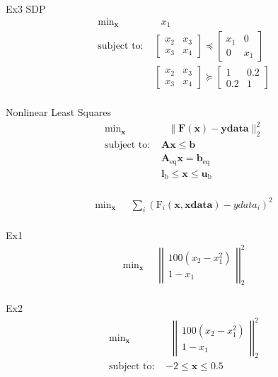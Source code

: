 \documentclass{article}
\begin{document}
Ex3 SDP
\begin{align*}
    \text{min}_{\mathbf{x}}& \text{ } x_1\\
    \mbox{subject to: }&\begin{bmatrix} x_2 & x_3 \\ x_3 & x_4 \end{bmatrix} \preceq \begin{bmatrix} x_1 & 0 \\ 0 & x_1 \end{bmatrix}\\
                       &\begin{bmatrix} x_2 & x_3 \\ x_3 & x_4 \end{bmatrix} \succeq \begin{bmatrix} 1 & 0.2 \\ 0.2 & 1 \end{bmatrix}\\
\end{align*}

Nonlinear Least Squares
\begin{align*}
    \text{min}_{\mathbf{x}}& \text{ } \| \mathbf{F} \left(\mathbf{x}\right) - \mathbf{ydata} \|_2^2\\
    \mbox{subject to: }& \mathbf{A}\mathbf{x} \le \mathbf{b}\\
                       & \mathbf{A}_{\text{eq}}\mathbf{x} = \mathbf{b}_{\text{eq}}\\
                       & \mathbf{l}_{\text{b}} \le \mathbf{x} \le \mathbf{u}_{\text{b}}\\
\end{align*}

\begin{align*}
\text{min}_{\mathbf{x}}& \text{ } \sum_i \left( \text{F}_i \left( \mathbf{x}, \mathbf{xdata} \right) - ydata_i \right)^2\\
\end{align*}

Ex1
\begin{align*}
\text{min}_{\mathbf{x}}& \text{ } \left|\left| \begin{matrix} 100\left(x_2-x_1^2\right) \\1-x_1 \end{matrix}  \right|\right|_2^2\\
\end{align*}

Ex2
\begin{align*}
\text{min}_{\mathbf{x}}& \text{ } \left|\left| \begin{matrix} 100\left(x_2-x_1^2\right) \\1-x_1 \end{matrix}  \right|\right|_2^2\\
\mbox{subject to: }& -2 \le \mathbf{x} \le 0.5\\
\end{align*}
\end{document}
